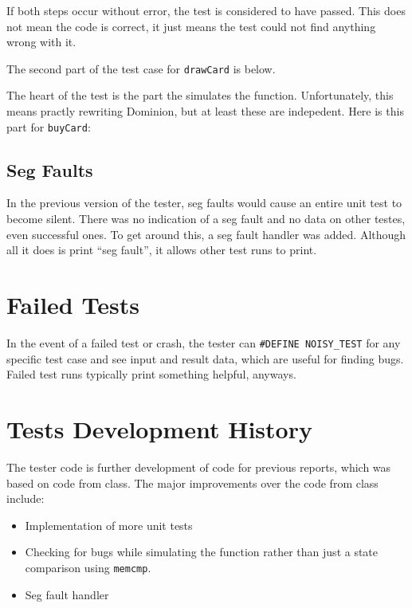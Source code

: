 \documentclass[letterpaper,12pt]{article}
\begin{document}
If both steps occur without error, the test is considered to have passed. This
does not mean the code is correct, it just means the test could not find
anything wrong with it.

The second part of the test case for {\tt drawCard} is below.

\begin{scriptsize}

\end{scriptsize}

The heart of the test is the part the simulates the function. Unfortunately,
this means practly rewriting Dominion, but at least these are indepedent. Here
is this part for {\tt buyCard}:

\begin{scriptsize}

\end{scriptsize}

\subsection{Seg Faults}
In the previous version of the tester, seg faults would cause an entire unit
test to become silent. There was no indication of a seg fault and no data on
other testes, even successful ones. To get around this, a seg fault handler was
added. Although all it does is print ``seg fault'', it allows other test runs
to print.

\section{Failed Tests}
In the event of a failed test or crash, the tester can
{\tt \#DEFINE NOISY\_TEST} for any specific test case and see input and result
data, which are useful for finding bugs. Failed test runs typically print
something helpful, anyways.

\section{Tests Development History}
The tester code is further development of code for previous reports, which was
based on code from class. The major improvements over the code from class
include:
\begin{itemize}
	\item Implementation of more unit tests
	\item Checking for bugs while simulating the function rather than just a
	state comparison using {\tt memcmp}.
	\item Seg fault handler
\end{itemize}
\end{document}
